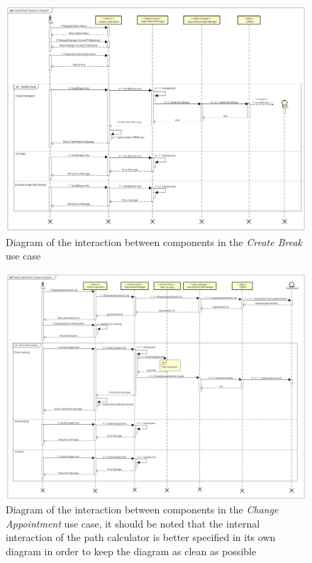 \begin{figure}[h]
\centering
\includegraphics[width = \textwidth, keepaspectratio = true, angle=90]{Img/CreateBreakSequence}
\caption{Diagram of the interaction between components in the \emph{Create Break} use case}
\label{fig:CreateBreakSequence}
\end{figure}

\begin{figure}[h]
\centering
\includegraphics[width = \textwidth, keepaspectratio = true, angle=90]{Img/ChangeAppointmentSequence}
\caption{Diagram of the interaction between components in the \emph{Change Appointment} use case, it should be noted that the internal interaction of the path calculator is better specified in its own diagram in order to keep the diagram as clean as possible}
\label{fig:ChangeAppointmentSequence}
\end{figure}

